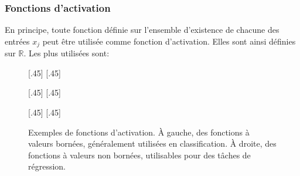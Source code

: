 \subsubsection{Fonctions d'activation}\label{chapter-ML-section-DNN-neuron-activ_fct}
En principe, toute fonction définie sur l'ensemble d'existence de chacune des entrées $x_j$ peut être utilisée comme fonction d'activation.
Elles sont ainsi définies sur $\mathbb{R}$.
Les plus utilisées sont:
\begin{figure}[p]
\centering

[.45\textwidth]
{\vspace{-\baselineskip}}
\hfill
{}[.45\textwidth]
{\vspace{-\baselineskip}}

\vspace{.5\baselineskip}

[.45\textwidth]
{\vspace{-\baselineskip}}
\hfill
{}[.45\textwidth]
{\vspace{-\baselineskip}}

\vspace{.5\baselineskip}

[.45\textwidth]
{\vspace{-\baselineskip}}
\hfill
{}[.45\textwidth]
{\vspace{-\baselineskip}}

\vspace{.5\baselineskip}

\caption[Exemples de fonctions d'activation.]{Exemples de fonctions d'activation. À gauche, des fonctions à valeurs bornées, généralement utilisées en classification. À droite, des fonctions à valeurs non bornées, utilisables pour des tâches de régression.}
\label{fig-act_fct}
\end{figure}
